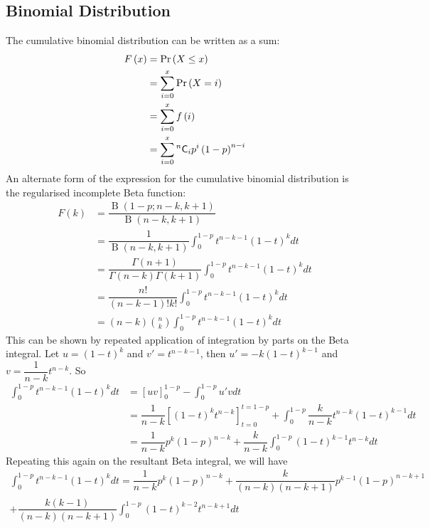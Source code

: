 \documentclass[11pt]{report} %
\begin{document}
\subsection{Binomial Distribution}

The cumulative binomial distribution can be written as a sum:
\begin{align}
F\left(x\right) &= \operatorname{Pr}\left(X \leq x\right) \\
&= \sum_{i = 0}^{x}\operatorname{Pr}\left(X = i\right) \\
&= \sum_{i = 0}^{x}f\left(i\right) \\
&= \sum_{i = 0}^{x}\mathstrut^{n}\mathsf{C}_{i}p^{i}\left(1 - p\right)^{n - i}
\end{align}
An alternate form of the expression for the cumulative binomial distribution is the regularised incomplete Beta function:
\begin{align}
F\left(k\right) &= \dfrac{\operatorname{B}\left(1 - p; n - k, k + 1\right)}{\operatorname{B}\left(n - k, k + 1\right)} \\
&= \dfrac{1}{\operatorname{B}\left(n - k, k + 1\right)}\int_{0}^{1 - p}t^{n - k - 1}\left(1 - t\right)^{k}dt \\
&= \dfrac{\Gamma\left(n + 1\right)}{\Gamma\left(n - k\right)\Gamma\left(k + 1\right)}\int_{0}^{1 - p}t^{n - k - 1}\left(1 - t\right)^{k}dt \\
&= \dfrac{n!}{\left(n - k - 1\right)!k!}\int_{0}^{1 - p}t^{n - k - 1}\left(1 - t\right)^{k}dt \\
&= \left(n - k\right)\binom{n}{k}\int_{0}^{1 - p}t^{n - k - 1}\left(1 - t\right)^{k}dt
\end{align}
This can be shown by repeated application of integration by parts on the Beta integral. Let $u = \left(1 - t\right)^{k}$ and $v' = t^{n - k - 1}$, then $u' = -k\left(1 - t\right)^{k - 1}$ and $v = \dfrac{1}{n - k}t^{n - k}$. So
\begin{align}
\int_{0}^{1 - p}t^{n - k - 1}\left(1 - t\right)^{k}dt &= \left[uv\right]_{0}^{1 - p} - \int_{0}^{1 - p}u'vdt \\
&= \dfrac{1}{n - k}\left[\left(1 - t\right)^{k}t^{n - k}\right]_{t = 0}^{t = 1 - p} + \int_{0}^{1 - p}\dfrac{k}{n - k}t^{n - k}\left(1 - t\right)^{k - 1}dt \\
&= \dfrac{1}{n - k}p^{k}\left(1 - p\right)^{n - k} + \dfrac{k}{n - k}\int_{0}^{1 - p}\left(1 - t\right)^{k - 1}t^{n - k}dt
\end{align}
Repeating this again on the resultant Beta integral, we will have
\begin{multline}
\int_{0}^{1 - p}t^{n - k - 1}\left(1 - t\right)^{k}dt = \dfrac{1}{n - k}p^{k}\left(1 - p\right)^{n - k} + \dfrac{k}{\left(n - k\right)\left(n - k + 1\right)}p^{k - 1}\left(1 - p\right)^{n - k + 1} \\
 + \dfrac{k\left(k - 1\right)}{\left(n - k\right)\left(n - k + 1\right)}\int_{0}^{1 - p}\left(1 - t\right)^{k - 2}t^{n - k + 1}dt
\end{multline}
\end{document}
